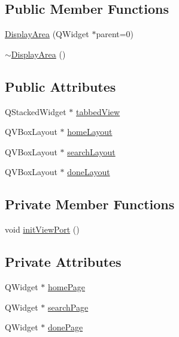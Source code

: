 \subsection*{Public Member Functions}
\begin{DoxyCompactItemize}
\item 
\hyperlink{class_do_lah_1_1_display_area_a9059dd4d9afc73ec3b2ebfc59ad82d92}{Display\+Area} (Q\+Widget $\ast$parent=0)
\item 
\hyperlink{class_do_lah_1_1_display_area_a99c506b4cd091fe08ca4fc0357e3dc44}{$\sim$\+Display\+Area} ()
\end{DoxyCompactItemize}
\subsection*{Public Attributes}
\begin{DoxyCompactItemize}
\item 
Q\+Stacked\+Widget $\ast$ \hyperlink{class_do_lah_1_1_display_area_a35f9dbc424ce552bc50427d624f74321}{tabbed\+View}
\item 
Q\+V\+Box\+Layout $\ast$ \hyperlink{class_do_lah_1_1_display_area_aa16ca495275d4ae6ff0f58efa13095be}{home\+Layout}
\item 
Q\+V\+Box\+Layout $\ast$ \hyperlink{class_do_lah_1_1_display_area_a9b549e5f86204024bb90bf1062f2e32b}{search\+Layout}
\item 
Q\+V\+Box\+Layout $\ast$ \hyperlink{class_do_lah_1_1_display_area_a380f03cb6c480ca65ab03d4dfcf34b80}{done\+Layout}
\end{DoxyCompactItemize}
\subsection*{Private Member Functions}
\begin{DoxyCompactItemize}
\item 
void \hyperlink{class_do_lah_1_1_display_area_aa4af5f0cc1405eac87bb65c89ef8bcef}{init\+View\+Port} ()
\end{DoxyCompactItemize}
\subsection*{Private Attributes}
\begin{DoxyCompactItemize}
\item 
Q\+Widget $\ast$ \hyperlink{class_do_lah_1_1_display_area_a0bc53d7bed11ca86102a8f211a02d738}{home\+Page}
\item 
Q\+Widget $\ast$ \hyperlink{class_do_lah_1_1_display_area_a43924eaffd8f850ee9cab55a848a1fb8}{search\+Page}
\item 
Q\+Widget $\ast$ \hyperlink{class_do_lah_1_1_display_area_a80d6a81a64c1722ee99bde9e3770cb79}{done\+Page}
\end{DoxyCompactItemize}


